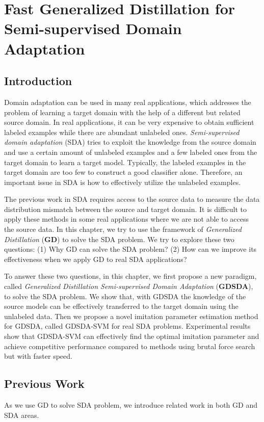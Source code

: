 \chapter{Fast Generalized Distillation for Semi-supervised Domain Adaptation}\label{sec:aaai}
\section{Introduction}
Domain adaptation can be used in many real applications, which addresses the problem of learning a target domain with the help of a different but related source domain. 
In real applications, it can be very expensive to obtain sufficient labeled examples while there are abundant unlabeled ones. 
\textit{Semi-supervised domain adaptation} (SDA) tries to exploit the knowledge from the source domain and use a certain amount of unlabeled examples and a few labeled ones from the target domain to learn a target model. Typically, the labeled examples in the target domain are too few to construct a good classifier alone. Therefore, an important issue in SDA is how to effectively utilize the unlabeled examples.

The previous work in SDA requires access to the source data to measure the data distribution mismatch between the source and target domain\cite{duan2009domain,Donahue_2013_CVPR,daume2010frustratingly,yao2015semi}. It is difficult to apply these methods in some real applications where we are not able to access the source data. In this chapter, we try to use the framework of \textit{Generalized Distillation} (\textbf{GD})\cite{lopez2015unifying} to solve the SDA problem. We try to explore these two questions: (1) Why GD can solve the SDA problem? (2) How can we improve its effectiveness when we apply GD to real SDA applications?

To answer these two questions, in this chapter, we first propose a new paradigm, called \textit{Generalized Distillation Semi-supervised Domain Adaptation} (\textbf{GDSDA}), to solve the SDA problem. We show that, with GDSDA the knowledge of the source models can be effectively transferred to the target domain using the unlabeled data. Then we propose a novel imitation parameter estimation method for GDSDA, called GDSDA-SVM for real SDA problems. Experimental results show that GDSDA-SVM can effectively find the optimal imitation parameter and achieve competitive performance compared to methods using brutal force search but with faster speed. 

\section{Previous Work}\label{sec:aaai:work}
As we use GD to solve SDA problem, we introduce related work in both GD and SDA areas.

